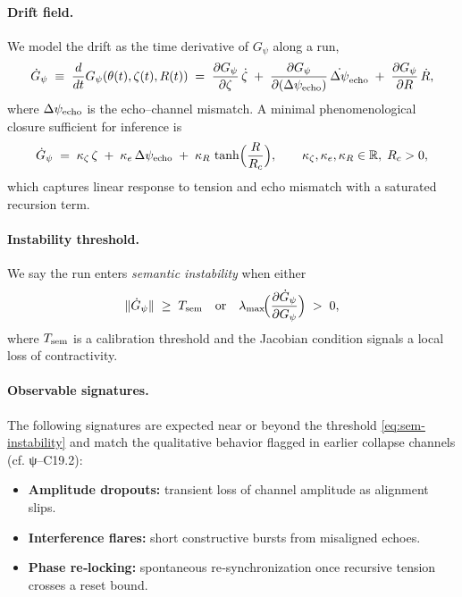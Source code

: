 \paragraph{Drift field.}
We model the drift as the time derivative of $G_\psi$ along a run,
\begin{equation}
\dot G_\psi \;\equiv\; \frac{d}{dt}G_\psi(\theta(t),\zeta(t),R(t))
\;=\; \frac{\partial G_\psi}{\partial \zeta}\,\dot\zeta \;+\; 
\frac{\partial G_\psi}{\partial (\Delta\psi_{\rm echo})}\,\dot{\Delta\psi}_{\rm echo} \;+\;
\frac{\partial G_\psi}{\partial R}\,\dot R,
\label{eq:drift-field}
\end{equation}
where $\Delta\psi_{\rm echo}$ is the echo–channel mismatch. A minimal phenomenological closure sufficient for inference is
\begin{equation}
\dot G_\psi \;=\; \kappa_\zeta\,\zeta \;+\; \kappa_e\,\Delta\psi_{\rm echo} \;+\; \kappa_R\,\tanh\!\Big(\frac{R}{R_c}\Big),
\qquad
\kappa_\zeta,\kappa_e,\kappa_R\in \mathbb{R},\; R_c>0,
\label{eq:drift-closure}
\end{equation}
which captures linear response to tension and echo mismatch with a saturated recursion term.

\paragraph{Instability threshold.}
We say the run enters \emph{semantic instability} when either
\begin{equation}
\|\dot G_\psi\| \;\ge\; T_{\rm sem}
\quad\text{or}\quad
\lambda_{\max}\!\Big(\frac{\partial \dot G_\psi}{\partial G_\psi}\Big)\;>\;0,
\label{eq:sem-instability}
\end{equation}
where $T_{\rm sem}$ is a calibration threshold and the Jacobian condition signals a local loss of contractivity.

\paragraph{Observable signatures.}
The following signatures are expected near or beyond the threshold \eqref{eq:sem-instability} and match the qualitative behavior flagged in earlier collapse channels (cf. ψ–C19.2):
\begin{itemize}
  \item \textbf{Amplitude dropouts:} transient loss of channel amplitude as alignment slips.
  \item \textbf{Interference flares:} short constructive bursts from misaligned echoes.
  \item \textbf{Phase re‑locking:} spontaneous re‑synchronization once recursive tension crosses a reset bound.
\end{itemize}

